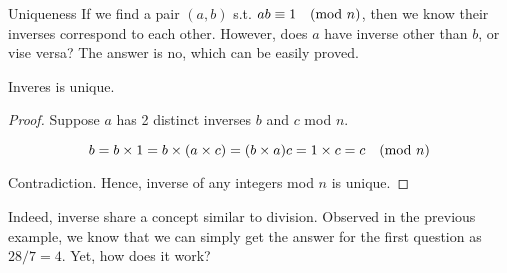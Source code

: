 \mynewpage
\begin{mysubsection}{Uniqueness}
    If we find a pair $(a,b)$ s.t. $ab\equiv 1\quad (\textnormal{mod }n)$, then we know their inverses correspond to each other. However, does $a$ have inverse other than $b$, or vise versa? The answer is no, which can be easily proved.

    \myframebreak
    \begin{theorem}[thm:]{}
        Inveres is unique.
    \end{theorem}

    \begin{proof}
        Suppose $a$ has 2 distinct inverses $b$ and $c$ mod $n$.

        \begin{equation*}
            b=b\times 1=b\times (a\times c)=(b\times a)c=1\times c=c\quad (\textnormal{mod }n)
        \end{equation*}

        Contradiction. Hence, inverse of any integers mod $n$ is unique.
    \end{proof}
\end{mysubsection}

\begin{shortque}[]{}



     Indeed, inverse share a concept similar to division. Observed in the previous example, we know that we can simply get the answer for the first question as $28/7=4$. Yet, how does it work?
\end{shortque}

